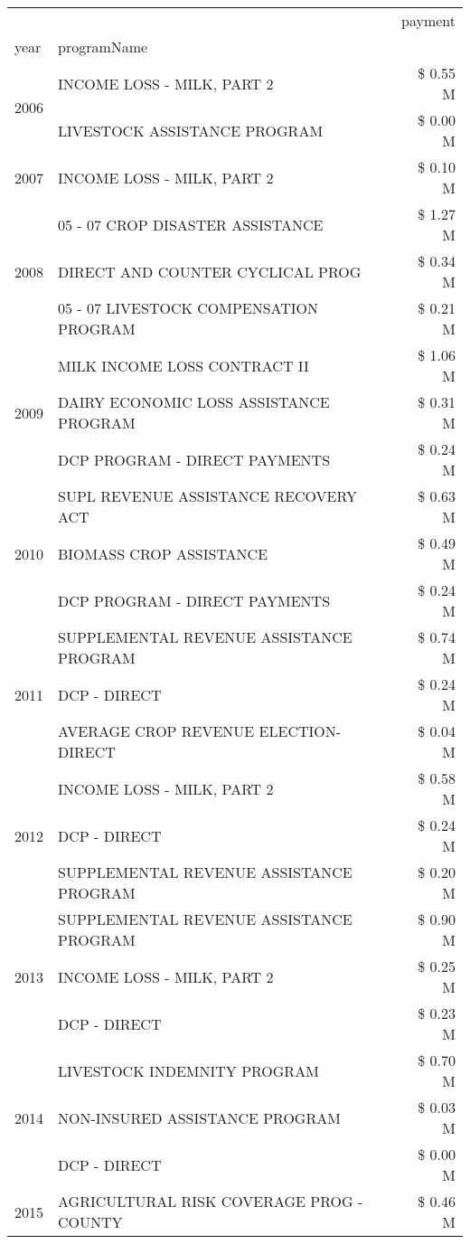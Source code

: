 \begin{tabular}{llr}
\toprule
 &  & payment \\
year & programName &  \\
\midrule
\multirow[t]{2}{*}{2006} & INCOME LOSS - MILK, PART 2 & \$ 0.55 M \\
 & LIVESTOCK ASSISTANCE PROGRAM & \$ 0.00 M \\
\cline{1-3}
2007 & INCOME LOSS - MILK, PART 2 & \$ 0.10 M \\
\cline{1-3}
\multirow[t]{3}{*}{2008} & 05 - 07 CROP DISASTER ASSISTANCE & \$ 1.27 M \\
 & DIRECT AND COUNTER CYCLICAL PROG & \$ 0.34 M \\
 & 05 - 07 LIVESTOCK COMPENSATION PROGRAM & \$ 0.21 M \\
\cline{1-3}
\multirow[t]{3}{*}{2009} & MILK INCOME LOSS CONTRACT II & \$ 1.06 M \\
 & DAIRY ECONOMIC LOSS ASSISTANCE PROGRAM & \$ 0.31 M \\
 & DCP PROGRAM - DIRECT PAYMENTS & \$ 0.24 M \\
\cline{1-3}
\multirow[t]{3}{*}{2010} & SUPL REVENUE ASSISTANCE RECOVERY ACT & \$ 0.63 M \\
 & BIOMASS CROP ASSISTANCE & \$ 0.49 M \\
 & DCP PROGRAM - DIRECT PAYMENTS & \$ 0.24 M \\
\cline{1-3}
\multirow[t]{3}{*}{2011} & SUPPLEMENTAL REVENUE ASSISTANCE PROGRAM & \$ 0.74 M \\
 & DCP - DIRECT & \$ 0.24 M \\
 & AVERAGE CROP REVENUE ELECTION-DIRECT & \$ 0.04 M \\
\cline{1-3}
\multirow[t]{3}{*}{2012} & INCOME LOSS - MILK, PART 2 & \$ 0.58 M \\
 & DCP - DIRECT & \$ 0.24 M \\
 & SUPPLEMENTAL REVENUE ASSISTANCE PROGRAM & \$ 0.20 M \\
\cline{1-3}
\multirow[t]{3}{*}{2013} & SUPPLEMENTAL REVENUE ASSISTANCE PROGRAM & \$ 0.90 M \\
 & INCOME LOSS - MILK, PART 2 & \$ 0.25 M \\
 & DCP - DIRECT & \$ 0.23 M \\
\cline{1-3}
\multirow[t]{3}{*}{2014} & LIVESTOCK INDEMNITY PROGRAM & \$ 0.70 M \\
 & NON-INSURED ASSISTANCE PROGRAM & \$ 0.03 M \\
 & DCP - DIRECT & \$ 0.00 M \\
\cline{1-3}
\multirow[t]{3}{*}{2015} & AGRICULTURAL RISK COVERAGE PROG - COUNTY & \$ 0.46 M \\

\end{tabular}
